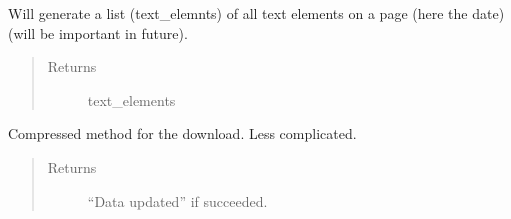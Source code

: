 \documentclass[letterpaper,10pt,english]{sphinxmanual}
\begin{document}
\begin{fulllineitems}

\begin{fulllineitems}
\label{\detokenize{DwdDataScrapper:DwdDataScrapper.DataScrapper.get_external_date}}
\sphinxAtStartPar
{} Will generate a list (text\_elemnts) of all text elements on a page (here the date) (will be important in future).
\begin{quote}\begin{description}
\item[{Returns}] \leavevmode
\sphinxAtStartPar
text\_elements 

\end{description}\end{quote}

\end{fulllineitems}


\begin{fulllineitems}
\label{\detokenize{DwdDataScrapper:DwdDataScrapper.DataScrapper.main_update_data}}
\sphinxAtStartPar
{} Compressed method for the download. Less complicated.
\begin{quote}\begin{description}
\item[{Returns}] \leavevmode
\sphinxAtStartPar
“Data updated” if succeeded.

\end{description}\end{quote}

\end{fulllineitems}


\end{fulllineitems}
\end{document}
